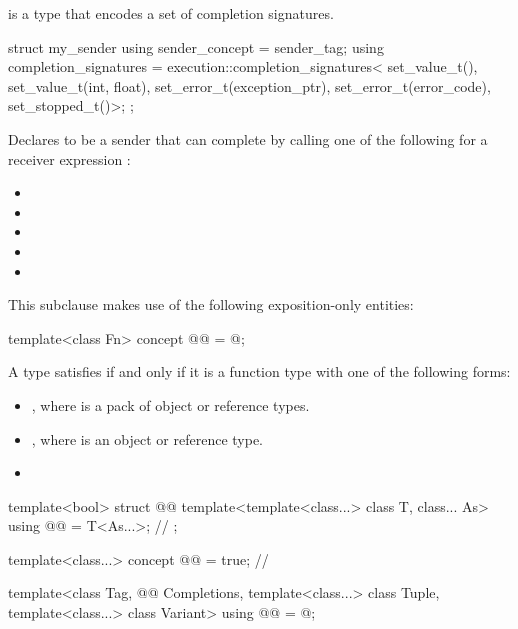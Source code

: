 \pnum
{} is a type
that encodes a set of completion signatures.

\pnum
\begin{example}
\begin{codeblock}
struct my_sender {
  using sender_concept = sender_tag;
  using completion_signatures =
    execution::completion_signatures<
      set_value_t(),
      set_value_t(int, float),
      set_error_t(exception_ptr),
      set_error_t(error_code),
      set_stopped_t()>;
};
\end{codeblock}
Declares  to be a sender
that can complete by calling one of the following
for a receiver expression :
\begin{itemize}
\item {}
\item {}
\item {}
\item {}
\item {}
\end{itemize}
\end{example}

\pnum
This subclause makes use of the following exposition-only entities:
\begin{codeblock}
template<class Fn>
  concept @@ = @\seebelow@;
\end{codeblock}

\pnum
A type  satisfies 
if and only if it is a function type with one of the following forms:
\begin{itemize}
\item
{},
where  is a pack of object or reference types.
\item
{},
where  is an object or reference type.
\item
{}
\end{itemize}

\pnum
\begin{codeblock}
template<bool>
  struct @@ {
    template<template<class...> class T, class... As>
      using @@ = T<As...>;                              // \expos
  };

template<class...>
  concept @@ = true;                                   // \expos

template<class Tag,
         @@ Completions,
         template<class...> class Tuple,
         template<class...> class Variant>
  using @@ = @\seebelow@;
\end{codeblock}

